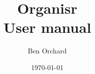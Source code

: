

\usepackage{amsfonts}
\usepackage{newunicodechar}

\usepackage{marginnote}

\newcommand{\tip}[1]{\medskip\noindent\reversemarginpar\marginnote{\textit{\textbf{TIP}}}#1\medskip}



\title{Organisr\\
User manual}
\author{Ben Orchard}

\date{\today}

\maketitle

\clearpage
\tableofcontents
\clearpage

\newcommand{\guiel}[1]{\textbf{#1}}
\newcommand{\fullimg}[1]{\texttt{[image: \#1]}}
\newcommand{\smallimg}[1]{\texttt{[image: \#1]}}
\newcommand{\halfimg}[1]{\texttt{[image: \#1]}}

\clearpage
{}


